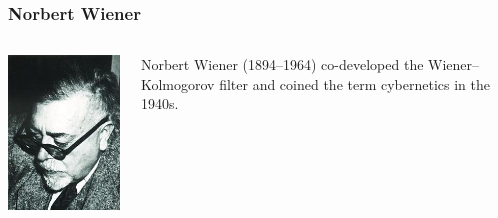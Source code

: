 \documentclass{beamer}
\begin{document}
\begin{frame}
\frametitle{Norbert Wiener}
\label{sec-2-8}
\begin{columns}
\begin{column}{0.3\textwidth}
\label{sec-2-8-1}

   \includegraphics[width=.9\linewidth]{image/Wiener.jpg}
\end{column}
\begin{column}{0.7\textwidth}
\label{sec-2-8-2}


   Norbert Wiener (1894–1964) co-developed the Wiener–Kolmogorov filter and coined the term cybernetics in the 1940s.
\end{column}
\end{columns}
\end{frame}
\end{document}
